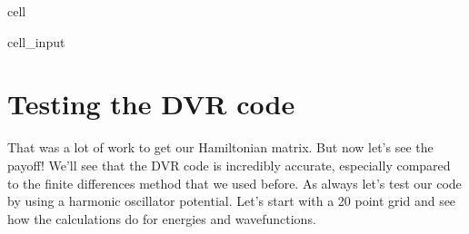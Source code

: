 \documentclass[letterpaper,10pt,english]{jupyterBook}
\begin{document}
\begin{sphinxuseclass}{cell}\begin{sphinxVerbatimInput}

\begin{sphinxuseclass}{cell_input}
\begin{sphinxVerbatim}[commandchars=\\\{\}]
 
      
     

 
       
\end{sphinxVerbatim}

\end{sphinxuseclass}\end{sphinxVerbatimInput}

\end{sphinxuseclass}

\section{Testing the DVR code}
\label{\detokenize{Section4_v2:testing-the-dvr-code}}
\sphinxAtStartPar
That was a lot of work to get our Hamiltonian matrix. But now let’s see the payoff! We’ll see that the DVR code is incredibly accurate, especially compared to the finite differences method that we used before. As always let’s test our code by using a harmonic oscillator potential. Let’s start with a 20 point grid and see how the calculations do for energies and wavefunctions.
\end{document}
